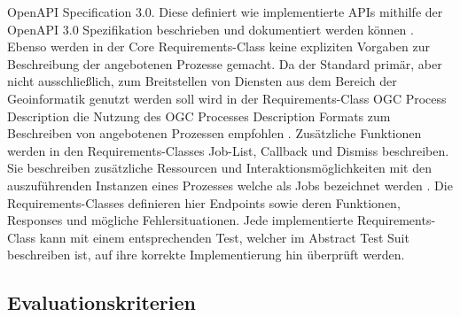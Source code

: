 OpenAPI Specification 3.0. Diese definiert wie implementierte APIs mithilfe der OpenAPI 3.0 Spezifikation beschrieben und dokumentiert werden können \cite{ogc_api_processes_core}.
Ebenso werden in der Core Requirements-Class keine expliziten Vorgaben zur Beschreibung der angebotenen Prozesse gemacht. Da der Standard primär, aber nicht
ausschließlich, zum Breitstellen von Diensten aus dem Bereich der Geoinformatik genutzt werden soll wird in der Requirements-Class OGC Process Description die Nutzung des 
OGC Processes Description Formats zum Beschreiben von angebotenen Prozessen empfohlen \cite{ogc_api_processes_core}. 
Zusätzliche Funktionen werden in den Requirements-Classes Job-List, Callback und Dismiss beschreiben. Sie beschreiben zusätzliche Ressourcen und Interaktionsmöglichkeiten 
mit den auszuführenden Instanzen eines Prozesses welche als Jobs bezeichnet werden \cite{ogc_api_processes_core}.
Die Requirements-Classes definieren hier Endpoints sowie deren Funktionen, Responses und mögliche Fehlersituationen. Jede implementierte Requirements-Class kann mit einem 
entsprechenden Test, welcher im Abstract Test Suit beschreiben ist, auf ihre korrekte Implementierung hin überprüft werden. 
\subsection{Evaluationskriterien}


